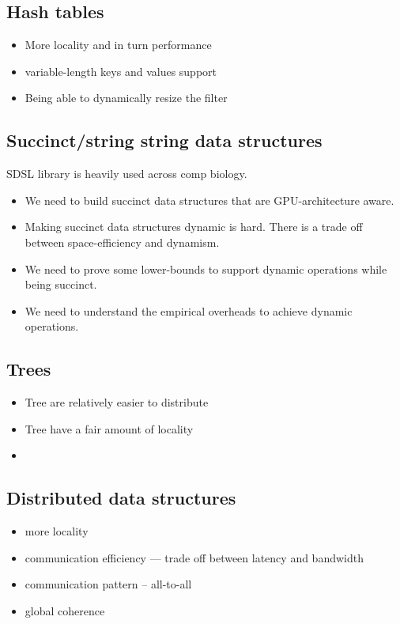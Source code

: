 \subsection{Hash tables}
\begin{itemize}
    \item More locality and in turn performance
    \item variable-length keys and values support
    \item Being able to dynamically resize the filter
\end{itemize}

\subsection{Succinct/string string data structures}
SDSL library is heavily used across comp biology.

\begin{itemize}
    \item We need to build succinct data structures that are GPU-architecture aware.
    \item Making succinct data structures dynamic is hard. There is a trade off between space-efficiency and dynamism.
    \item We need to prove some lower-bounds to support dynamic operations while being succinct.
    \item We need to understand the empirical overheads to achieve dynamic operations.
\end{itemize}

\subsection{Trees}
\begin{itemize}
    \item Tree are relatively easier to distribute
    \item Tree have a fair amount of locality
    \item
\end{itemize}

\subsection{Distributed data structures}

\begin{itemize}
    \item more locality
    \item communication efficiency --- trade off between latency and bandwidth
    \item communication pattern -- all-to-all
    \item global coherence
\end{itemize}

